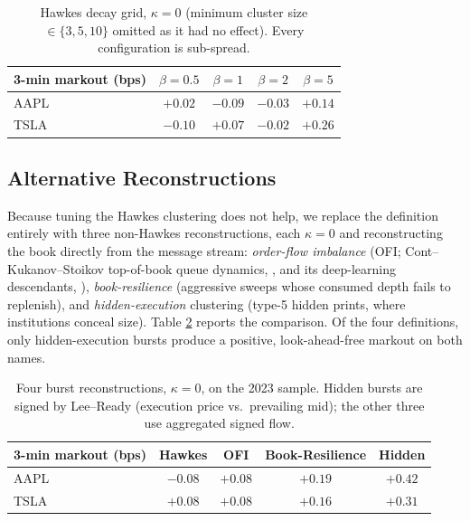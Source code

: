 \documentclass[11pt]{article}
\begin{document}
\begin{table}[htbp]
\centering
\begin{tabular}{lcccc}
\toprule
\textbf{3-min markout (bps)} & $\beta=0.5$ & $\beta=1$ & $\beta=2$ & $\beta=5$ \\
\midrule
AAPL & $+0.02$ & $-0.09$ & $-0.03$ & $+0.14$ \\
TSLA & $-0.10$ & $+0.07$ & $-0.02$ & $+0.26$ \\
\bottomrule
\end{tabular}
\caption{Hawkes decay grid, $\kappa=0$ (minimum cluster size $\in\{3,5,10\}$ omitted as it had no effect). Every configuration is sub-spread.}
\label{tab:hawkes_grid}
\end{table}

\subsection{Alternative Reconstructions}
Because tuning the Hawkes clustering does not help, we replace the definition entirely with three non-Hawkes reconstructions, each $\kappa=0$ and reconstructing the book directly from the message stream: \emph{order-flow imbalance} (OFI; Cont--Kukanov--Stoikov top-of-book queue dynamics, \citealp{cont2014}, and its deep-learning descendants, \citealp{kolm2023}), \emph{book-resilience} (aggressive sweeps whose consumed depth fails to replenish), and \emph{hidden-execution} clustering (type-5 hidden prints, where institutions conceal size). Table \ref{tab:altdefs} reports the comparison. Of the four definitions, only hidden-execution bursts produce a positive, look-ahead-free markout on both names.

\begin{table}[htbp]
\centering
\begin{tabular}{lcccc}
\toprule
\textbf{3-min markout (bps)} & Hawkes & OFI & Book-Resilience & Hidden \\
\midrule
AAPL & $-0.08$ & $+0.08$ & $+0.19$ & $+0.42$ \\
TSLA & $+0.08$ & $+0.08$ & $+0.16$ & $+0.31$ \\
\bottomrule
\end{tabular}
\caption{Four burst reconstructions, $\kappa=0$, on the 2023 sample. Hidden bursts are signed by Lee--Ready (execution price vs.\ prevailing mid); the other three use aggregated signed flow.}
\label{tab:altdefs}
\end{table}
\end{document}
